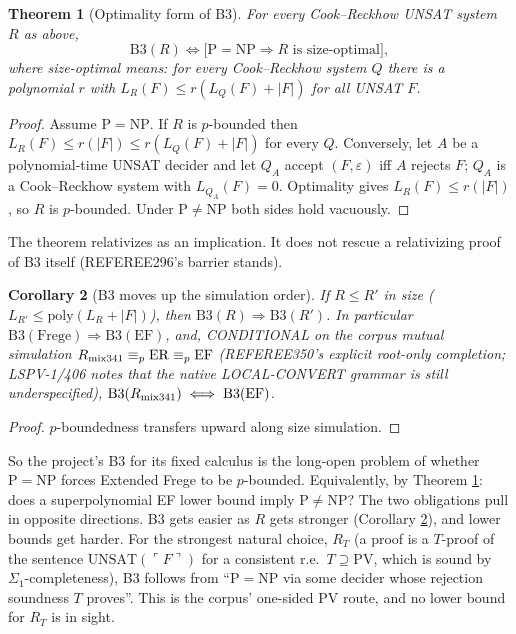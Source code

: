 \documentclass[11pt]{article}
\newtheorem{theorem}{Theorem}
\newtheorem{corollary}[theorem]{Corollary}
\begin{document}
\begin{theorem}[Optimality form of B3]\label{t2}
For every Cook--Reckhow UNSAT system $R$ as above,
\[
\mathrm{B3}(R)\iff\bigl[\mathrm P=\mathrm{NP}\Rightarrow R\text{ is size-optimal}\bigr],
\]
where size-optimal means: for every Cook--Reckhow system $Q$ there is a polynomial $r$
with $L_R(F)\le r(L_Q(F)+|F|)$ for all UNSAT $F$.
\end{theorem}
\begin{proof}
Assume $\mathrm P=\mathrm{NP}$. If $R$ is $p$-bounded then $L_R(F)\le r(|F|)\le r(L_Q(F)+|F|)$
for every $Q$. Conversely, let $A$ be a polynomial-time UNSAT decider and let $Q_A$ accept
$(F,\varepsilon)$ iff $A$ rejects $F$; $Q_A$ is a Cook--Reckhow system with $L_{Q_A}(F)=0$.
Optimality gives $L_R(F)\le r(|F|)$, so $R$ is $p$-bounded. Under $\mathrm P\ne\mathrm{NP}$ both
sides hold vacuously.
\end{proof}
The theorem relativizes as an implication. It does not rescue a relativizing proof of B3
itself (REFEREE296's barrier stands).

\begin{corollary}[B3 moves up the simulation order]\label{c3}
If $R\le R'$ in size ($L_{R'}\le\mathrm{poly}(L_R+|F|)$), then
$\mathrm{B3}(R)\Rightarrow\mathrm{B3}(R')$. In particular
$\mathrm{B3}(\text{Frege})\Rightarrow\mathrm{B3}(\mathrm{EF})$, and, CONDITIONAL on the corpus
mutual simulation $R_{\rm mix341}\equiv_p\mathrm{ER}\equiv_p\mathrm{EF}$ (REFEREE350's explicit root-only
completion; LSPV-1/406 notes that the native LOCAL-CONVERT grammar is still underspecified),
$\mathrm{B3}(R_{\rm mix341})\iff\mathrm{B3}(\mathrm{EF})$.
\end{corollary}
\begin{proof} $p$-boundedness transfers upward along size simulation. \end{proof}

So the project's B3 for its fixed calculus is the long-open problem of whether
$\mathrm P=\mathrm{NP}$ forces Extended Frege to be $p$-bounded. Equivalently, by Theorem
\ref{t2}: does a superpolynomial EF lower bound imply $\mathrm P\ne\mathrm{NP}$?
The two obligations pull in opposite directions. B3 gets easier as $R$ gets stronger
(Corollary \ref{c3}), and lower bounds get harder. For the strongest natural choice, $R_T$
(a proof is a $T$-proof of the sentence $\mathrm{UNSAT}(\ulcorner F\urcorner)$ for a consistent
r.e.\ $T\supseteq\mathrm{PV}$, which is sound by $\Sigma_1$-completeness), B3 follows from
``$\mathrm P=\mathrm{NP}$ via some decider whose rejection soundness $T$ proves''. This is the
corpus' one-sided PV route, and no lower bound for $R_T$ is in sight.
\end{document}
